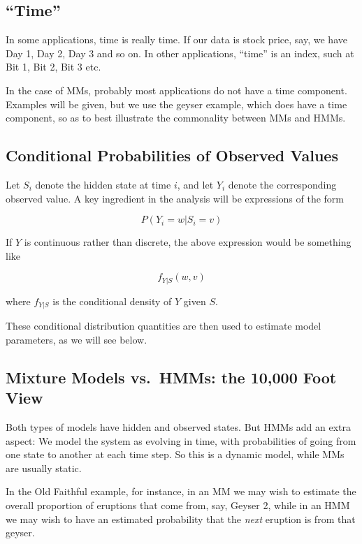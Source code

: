 \documentclass[11pt]{article}
\begin{document}
\subsection{``Time''}

In some applications, time is really time.  If our data is stock price,
say, we have Day 1, Day 2, Day 3 and so on.  In other applications,
``time'' is an index, such at Bit 1, Bit 2, Bit 3 etc.

In the case of MMs, probably most applications do not have a time
component.  Examples will be given, but we use the geyser example, which
does have a time component, so as to best illustrate the commonality
between MMs and HMMs.

\subsection{Conditional Probabilities of Observed Values}

Let $S_i$ denote the hidden state at time $i$, 
and let $Y_i$ denote the corresponding observed value.  A key ingredient
in the analysis will be expressions of the form

\begin{equation}
P(Y_i = w | S _i = v)
\end{equation}

If $Y$ is continuous rather than discrete, the above expression would be
something like

\begin{equation}
f_{Y|S} (w,v) 
\end{equation}

where $f_{Y|S}$ is the conditional density of $Y$ given $S$.

These conditional distribution quantities are then used to estimate
model parameters, as we will see below.

\subsection{Mixture Models vs.\ HMMs: the 10,000 Foot View}

Both types of models have hidden and observed states.  But HMMs add an
extra aspect:  We model the system as evolving in time, with
probabilities of going from one state to another at each time step.  So
this is a dynamic model, while MMs are usually static. 

In the Old Faithful example, for instance, in an MM we may wish to
estimate the overall proportion of eruptions that come from, say, Geyser
2, while in an HMM we may wish to have an estimated probability that the
\textit{next} eruption is from that geyser.
\end{document}

